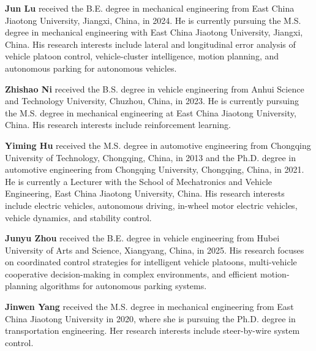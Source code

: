 \documentclass[twocolumn,3p,times,procedia]{elsarticle}
\begin{document}
\noindent\textbf{Jun Lu} received the B.E. degree in mechanical engineering from East China Jiaotong University, Jiangxi, China, in 2024. He is currently pursuing the M.S. degree in mechanical engineering with East China Jiaotong University, Jiangxi, China. His research interests include lateral and longitudinal error analysis of vehicle platoon control, vehicle-cluster intelligence, motion planning, and autonomous parking for autonomous vehicles.

\noindent\textbf{Zhishao Ni} received the B.S. degree in vehicle engineering from Anhui Science and Technology University, Chuzhou, China, in 2023. He is currently pursuing the M.S. degree in mechanical engineering at East China Jiaotong University, China. His research interests include reinforcement learning.

\noindent\textbf{Yiming Hu} received the M.S. degree in automotive engineering from Chongqing University of Technology, Chongqing, China, in 2013 and the Ph.D. degree in automotive engineering from Chongqing University, Chongqing, China, in 2021. He is currently a Lecturer with the School of Mechatronics and Vehicle Engineering, East China Jiaotong University, China. His research interests include electric vehicles, autonomous driving, in-wheel motor electric vehicles, vehicle dynamics, and stability control.

\noindent\textbf{Junyu Zhou} received the B.E. degree in vehicle engineering from Hubei University of Arts and Science, Xiangyang, China, in 2025. His research focuses on coordinated control strategies for intelligent vehicle platoons, multi-vehicle cooperative decision-making in complex environments, and efficient motion-planning algorithms for autonomous parking systems.

\noindent\textbf{Jinwen Yang} received the M.S. degree in mechanical engineering from East China Jiaotong University in 2020, where she is pursuing the Ph.D. degree in transportation engineering. Her research interests include steer-by-wire system control.
\end{document}
